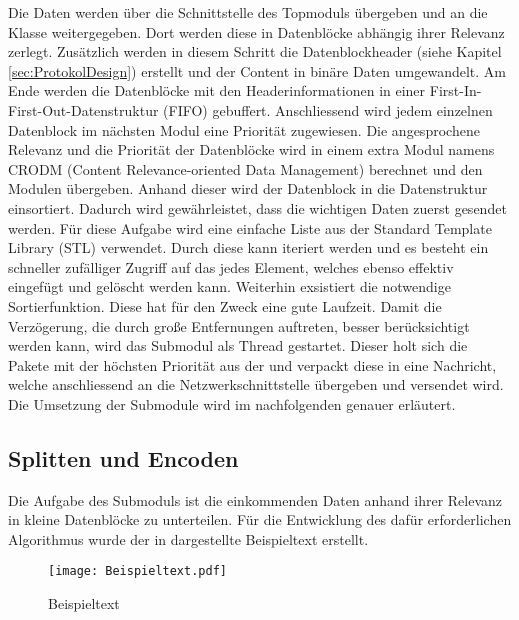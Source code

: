 Die Daten werden {\"u}ber die Schnittstelle des Topmoduls {\"u}bergeben und an die
Klasse  weitergegeben. Dort werden diese in Datenbl{\"o}cke
abh{\"a}ngig ihrer Relevanz zerlegt. Zus{\"a}tzlich werden in diesem Schritt die
Datenblockheader (siehe Kapitel \ref{sec:ProtokolDesign}) erstellt und der
Content in bin{\"a}re Daten umgewandelt. Am Ende werden die Datenbl{\"o}cke mit den
Headerinformationen in einer First-In-First-Out-Datenstruktur (FIFO)
gebuffert.
Anschliessend wird jedem einzelnen Datenblock im n{\"a}chsten Modul eine Priorit{\"a}t zugewiesen. Die angesprochene
Relevanz und die Priorit{\"a}t der Datenbl{\"o}cke wird in einem extra Modul namens
CRODM (Content Relevance-oriented Data Management)
berechnet und den Modulen {\"u}bergeben.
Anhand dieser wird der Datenblock in die Datenstruktur
 einsortiert. Dadurch wird
gew{\"a}hrleistet, dass die wichtigen Daten zuerst gesendet werden. F{\"u}r diese
Aufgabe wird eine einfache Liste aus der Standard Template Library (STL)
verwendet. Durch diese kann iteriert werden und es besteht ein schneller
zufälliger Zugriff auf das jedes Element, welches ebenso effektiv eingefügt und
gelöscht werden kann. Weiterhin exsistiert die notwendige Sortierfunktion. Diese
hat f{\"u}r den Zweck eine gute Laufzeit.
Damit die Verz{\"o}gerung, die durch gro{\ss}e Entfernungen auftreten, besser
ber{\"u}cksichtigt werden kann, wird das Submodul  als Thread
gestartet.
Dieser holt sich die Pakete mit der h{\"o}chsten Priorit{\"a}t aus der
 und verpackt diese in eine Nachricht, welche
anschliessend an die Netzwerkschnittstelle {\"u}bergeben und versendet wird. \newline
Die Umsetzung der Submodule wird im nachfolgenden genauer erl{\"a}utert.

\subsection{Splitten und Encoden}

Die Aufgabe des Submoduls  ist die einkommenden Daten
anhand ihrer Relevanz in kleine Datenbl{\"o}cke zu unterteilen. F{\"u}r die Entwicklung
des daf{\"u}r erforderlichen Algorithmus wurde der in 
dargestellte Beispieltext erstellt.

\begin{figure}[H]
\centering
\texttt{[image: Beispieltext.pdf]}
\caption{Beispieltext}
\label{fig:Beispieltext}
\end{figure}

